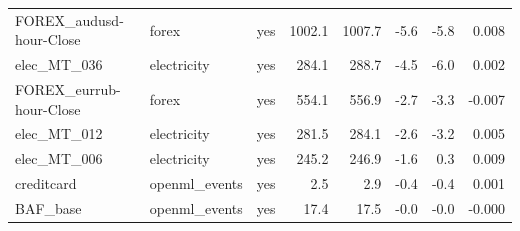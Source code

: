 \begin{longtable}{@{}l l c r r r r r@{}}
FOREX\_audusd-hour-Close & forex & yes & 1002.1 & 1007.7 & -5.6 & -5.8 & 0.008 \\
elec\_MT\_036 & electricity & yes & 284.1 & 288.7 & -4.5 & -6.0 & 0.002 \\
FOREX\_eurrub-hour-Close & forex & yes & 554.1 & 556.9 & -2.7 & -3.3 & -0.007 \\
elec\_MT\_012 & electricity & yes & 281.5 & 284.1 & -2.6 & -3.2 & 0.005 \\
elec\_MT\_006 & electricity & yes & 245.2 & 246.9 & -1.6 & 0.3 & 0.009 \\
creditcard & openml\_events & yes & 2.5 & 2.9 & -0.4 & -0.4 & 0.001 \\
BAF\_base & openml\_events & yes & 17.4 & 17.5 & -0.0 & -0.0 & -0.000 \\
\end{longtable}
